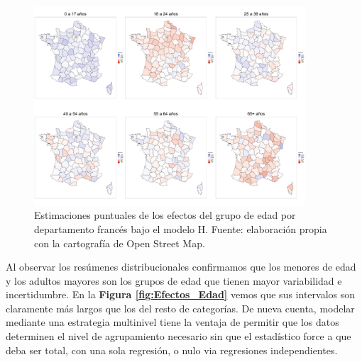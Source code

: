 \begin{figure}[h]
	\centering
	\includegraphics[width = 0.9\textwidth]{Figs/Efectos/Mapa_Efectos_Edad_Modelo_H}
	\caption{Estimaciones puntuales de los efectos del grupo de edad por departamento francés bajo el modelo H. Fuente: elaboración propia con la cartografía de Open Street Map.}
	\label{fig:Mapa_Efectos_Edad}
\end{figure}

Al observar los resúmenes distribucionales confirmamos que los menores de edad y los adultos mayores son los grupos de edad que tienen mayor variabilidad e incertidumbre. En la \textbf{Figura \ref{fig:Efectos_Edad}} vemos que sus intervalos son claramente más largos que los del resto de categorías. De nueva cuenta, modelar mediante una estrategia multinivel tiene la ventaja de permitir que los datos determinen el nivel de agrupamiento necesario sin que el estadístico force a que deba ser total, con una sola regresión, o nulo via regresiones independientes.\\ 

